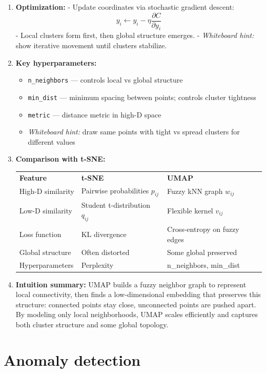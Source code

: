 \documentclass{article}
\begin{document}
\begin{enumerate}
\item \textbf{Optimization:}  
- Update coordinates via stochastic gradient descent:
\[
y_i \gets y_i - \eta \frac{\partial C}{\partial y_i}
\]
- Local clusters form first, then global structure emerges.  
- \emph{Whiteboard hint:} show iterative movement until clusters stabilize.

\item \textbf{Key hyperparameters:}
\begin{itemize}
    \item \texttt{n\_neighbors} — controls local vs global structure
    \item \texttt{min\_dist} — minimum spacing between points; controls cluster tightness
    \item \texttt{metric} — distance metric in high-D space
    \item \emph{Whiteboard hint:} draw same points with tight vs spread clusters for different values
\end{itemize}

\item \textbf{Comparison with t-SNE:}
\begin{tabular}{lll}
\textbf{Feature} & \textbf{t-SNE} & \textbf{UMAP} \\
High-D similarity & Pairwise probabilities $p_{ij}$ & Fuzzy kNN graph $w_{ij}$ \\
Low-D similarity & Student t-distribution $q_{ij}$ & Flexible kernel $v_{ij}$ \\
Loss function & KL divergence & Cross-entropy on fuzzy edges \\
Global structure & Often distorted & Some global preserved \\
Hyperparameters & Perplexity & n\_neighbors, min\_dist
\end{tabular}

\item \textbf{Intuition summary:}  
UMAP builds a fuzzy neighbor graph to represent local connectivity, then finds a low-dimensional embedding that preserves this structure: connected points stay close, unconnected points are pushed apart. By modeling only local neighborhoods, UMAP scales efficiently and captures both cluster structure and some global topology.
\end{enumerate}

\section*{Anomaly detection} 
\end{document}

